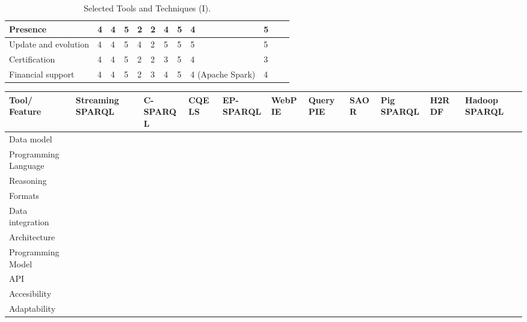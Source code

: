 \begin{sidewaystable}[!ht]
\begin{center}
\begin{tabular}[c]{|p{1.7cm}|p{1.5cm}|p{1.5cm}|p{1.5cm}|p{1.5cm}|p{1.5cm}|p{1.5cm}|p{1.5cm}|p{1.5cm}|p{1.5cm}|p{1.5cm}|p{1.5cm}|}
  Presence & 4 & 4 & 5 & 2 & 2 & 4 & 5 & 4 & 5 &  & \\ \hline  
  Update and evolution & 4 & 4 & 5  & 4 & 2 & 5 & 5 & 5 & 5 &  & \\ \hline  
  Certification & 4 &4 & 5 & 2 & 2 & 3 & 5 & 4 & 3 &  & \\ \hline  
  Financial support & 4 & 4&  5 & 2 & 3 & 4 & 5 & 4 (Apache Spark) & 4  &  & \\ \hline  
  
\hline
\end{tabular}
\caption{Selected Tools and Techniques (I).}\label{table:tools-1}
  \end{center}
\end{sidewaystable} 

\begin{sidewaystable}[!ht]
\renewcommand{\arraystretch}{1.3}
\tiny
\begin{center}
\begin{tabular}[c]{|p{1.7cm}|p{1.5cm}|p{1.5cm}|p{1.5cm}|p{1.5cm}|p{1.5cm}|p{1.5cm}|p{1.5cm}|p{1.5cm}|p{1.5cm}|p{1.5cm}|} 
\hline
 \textbf{Tool/ Feature}  &  Streaming SPARQL~\cite{Bolles:2008:SSE:1789394.1789438} & C-SPARQL~\cite{Barbieri:2010:EEC:1739041.1739095} & CQELS~\cite{deri2010} & EP-SPARQL~\cite{Anicic:2011:EUL:1963405.1963495} & WebPIE~\cite{DBLP:journals/ws/UrbaniKMHB12} & QueryPIE~\cite{Urbani:2011:QBR:2063016.2063063} & SAOR~\cite{DBLP:journals/ijswis/HoganHP09} & Pig SPARQL~\cite{Schatzle:2011:PMS:1999299.1999303} & H2RDF~\cite{Papailiou:2012:HAQ:2187980.2188058} & Hadoop SPARQL~\cite{liuhadoopsparql}  \\ \hline
  Data model &  &   &  &  &  &  &  &  &  & \\ \hline  
  Programming Language &  &   &  &  &  &  &  &  &  & \\ \hline  
  Reasoning &  &   &  &  &  &  &  &  &  & \\ \hline  
  Formats &  &   &  &  &  &  &  &  &  & \\ \hline  
  Data integration &  &   &  &  &  &  &  &  &  & \\ \hline  
  Architecture &  &   &  &  &  &  &  &  &  & \\ \hline  
  Programming Model &  &   &  &  &  &  &  &  &  & \\ \hline  
  API &  &   &  &  &  &  &  &  &  & \\ \hline  
  Accesibility &  &   &  &  &  &  &  &  &  & \\ \hline  
  Adaptability &  &   &  &  &  &  &  &  &  & \\ \hline  

\end{tabular}
\end{center}
\end{sidewaystable}

